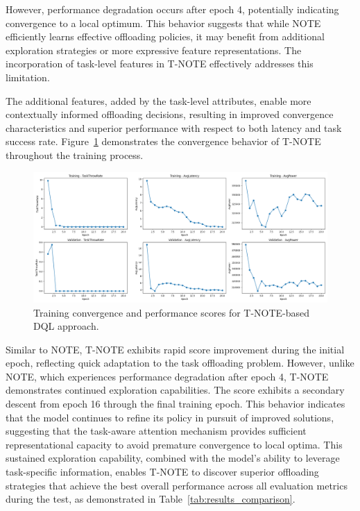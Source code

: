 \documentclass{svproc}
\begin{document}
However, performance degradation occurs after epoch 4, potentially indicating convergence to a local optimum. This behavior suggests that while NOTE efficiently learns effective offloading policies, it may benefit from additional exploration strategies or more expressive feature representations. The incorporation of task-level features in T-NOTE effectively addresses this limitation.

The additional features, added by the task-level attributes, enable more contextually informed offloading decisions, resulting in improved convergence characteristics and superior performance with respect to both latency and task success rate. Figure~\ref{fig:T-NOTE-score-plot} demonstrates the convergence behavior of T-NOTE throughout the training process.

\begin{figure}[H]
    \centering
    \includegraphics[width=1\linewidth]{figs/T-NOTE/score_plot.png}
    \caption{Training convergence and performance scores for T-NOTE-based DQL approach.}
    \label{fig:T-NOTE-score-plot}
\end{figure}

Similar to NOTE, T-NOTE exhibits rapid score improvement during the initial epoch, reflecting quick adaptation to the task offloading problem. However, unlike NOTE, which experiences performance degradation after epoch 4, T-NOTE demonstrates continued exploration capabilities. The score exhibits a secondary descent from epoch 16 through the final training epoch. This behavior indicates that the model continues to refine its policy in pursuit of improved solutions, suggesting that the task-aware attention mechanism provides sufficient representational capacity to avoid premature convergence to local optima. This sustained exploration capability, combined with the model's ability to leverage task-specific information, enables T-NOTE to discover superior offloading strategies that achieve the best overall performance across all evaluation metrics during the test, as demonstrated in Table~\ref{tab:results_comparison}.
\end{document}
